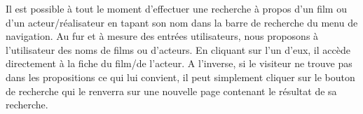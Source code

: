            Il est possible à tout le moment d'effectuer une recherche à propos d'un film ou d'un acteur/réalisateur en tapant son nom dans la barre de recherche du menu de navigation. Au fur et à mesure des entrées utilisateurs, nous proposons à l'utilisateur des noms de films ou d'acteurs. En cliquant sur l'un d'eux, il accède directement à la fiche du film/de l'acteur. A l'inverse, si le visiteur ne trouve pas dans les propositions ce qui lui convient, il peut simplement cliquer sur le bouton de recherche qui le renverra sur une nouvelle page contenant le résultat de sa recherche.

